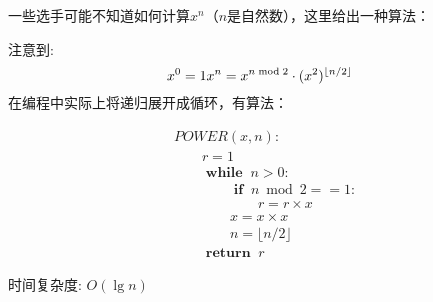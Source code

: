 一些选手可能不知道如何计算$x^n$（$n$是自然数），这里给出一种算法：

注意到:
$$
x^0 = 1\\
x^n = x^{n \bmod 2} \cdot (x^2)^{\lfloor n / 2 \rfloor}
$$
在编程中实际上将递归展开成循环，有算法：

$$
\begin{aligned}
& POWER(x, n):\\
& \hspace{2em}   r = 1\\
& \hspace{2em}   \boldsymbol{\operatorname{while }}\; n > 0:\\
& \hspace{4em}       \boldsymbol{\operatorname{if }}\; n \bmod 2 == 1:\\
& \hspace{6em}           r = r \times x\\
& \hspace{4em}       x = x \times x\\
& \hspace{4em}       n = \lfloor n / 2 \rfloor\\
& \hspace{2em}   \boldsymbol{\operatorname{return }}\; r
\end{aligned}
$$

时间复杂度: $O(\lg n)$